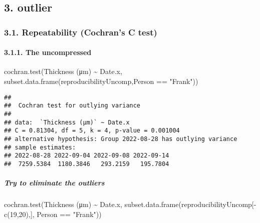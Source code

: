 \documentclass[
]{article}
\newenvironment{Shaded}{\begin{snugshade}}{\end{snugshade}}
\newcommand{\AttributeTok}[1]{\textcolor[rgb]{0.77,0.63,0.00}{#1}}
\newcommand{\DecValTok}[1]{\textcolor[rgb]{0.00,0.00,0.81}{#1}}
\newcommand{\FunctionTok}[1]{\textcolor[rgb]{0.00,0.00,0.00}{#1}}
\newcommand{\NormalTok}[1]{#1}
\newcommand{\SpecialCharTok}[1]{\textcolor[rgb]{0.00,0.00,0.00}{#1}}
\newcommand{\StringTok}[1]{\textcolor[rgb]{0.31,0.60,0.02}{#1}}
\begin{document}
\hypertarget{outlier}{%
\subsection{3. outlier}\label{outlier}}

\hypertarget{repeatability-cochrans-c-test}{%
\subsubsection{3.1. Repeatability (Cochran's C
test)}\label{repeatability-cochrans-c-test}}

\hypertarget{the-uncompressed}{%
\paragraph{3.1.1. The uncompressed}\label{the-uncompressed}}

\begin{Shaded}
\begin{Highlighting}[]
\FunctionTok{cochran.test}\NormalTok{(}\StringTok{\textasciigrave{}}\AttributeTok{Thickness (μm)}\StringTok{\textasciigrave{}} \SpecialCharTok{\textasciitilde{}}\NormalTok{ Date.x, }\FunctionTok{subset.data.frame}\NormalTok{(reproducibilityUncomp,Person }\SpecialCharTok{==} \StringTok{"Frank"}\NormalTok{))}
\end{Highlighting}
\end{Shaded}

\begin{verbatim}
## 
##  Cochran test for outlying variance
## 
## data:  `Thickness (μm)` ~ Date.x
## C = 0.81304, df = 5, k = 4, p-value = 0.001004
## alternative hypothesis: Group 2022-08-28 has outlying variance
## sample estimates:
## 2022-08-28 2022-09-04 2022-09-08 2022-09-14 
##  7259.5384  1180.3846   293.2159   195.7804
\end{verbatim}

\hypertarget{try-to-eliminate-the-outliers}{%
\subparagraph{Try to eliminate the
outliers}\label{try-to-eliminate-the-outliers}}

\begin{Shaded}
\begin{Highlighting}[]
\FunctionTok{cochran.test}\NormalTok{(}\StringTok{\textasciigrave{}}\AttributeTok{Thickness (μm)}\StringTok{\textasciigrave{}} \SpecialCharTok{\textasciitilde{}}\NormalTok{ Date.x, }\FunctionTok{subset.data.frame}\NormalTok{(reproducibilityUncomp[}\SpecialCharTok{{-}}\FunctionTok{c}\NormalTok{(}\DecValTok{19}\NormalTok{,}\DecValTok{20}\NormalTok{),], Person }\SpecialCharTok{==} \StringTok{"Frank"}\NormalTok{))}
\end{Highlighting}
\end{Shaded}
\end{document}

